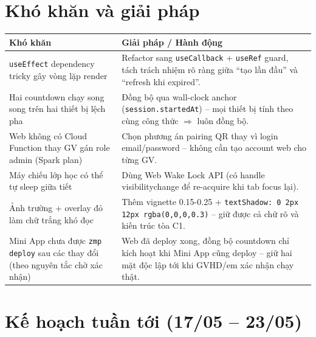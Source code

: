 \documentclass{article}
\begin{document}
\section{Khó khăn và giải pháp}

\begin{tabularx}{\textwidth}{@{}X X@{}}
\toprule
\textbf{Khó khăn} & \textbf{Giải pháp / Hành động} \\
\midrule
\texttt{useEffect} dependency tricky gây vòng lặp render & Refactor sang \texttt{useCallback} + \texttt{useRef} guard, tách trách nhiệm rõ ràng giữa ``tạo lần đầu'' và ``refresh khi expired''. \\
\addlinespace
Hai countdown chạy song song trên hai thiết bị lệch pha & Đồng bộ qua wall-clock anchor (\texttt{session.startedAt}) -- mọi thiết bị tính theo cùng công thức $\Rightarrow$ luôn đồng bộ. \\
\addlinespace
Web không có Cloud Function thay GV gán role admin (Spark plan) & Chọn phương án pairing QR thay vì login email/password -- không cần tạo account web cho từng GV. \\
\addlinespace
Máy chiếu lớp học có thể tự sleep giữa tiết & Dùng Web Wake Lock API (có handle visibilitychange để re-acquire khi tab focus lại). \\
\addlinespace
Ảnh trường + overlay đỏ làm chữ trắng khó đọc & Thêm vignette 0.15-0.25 + \texttt{textShadow: 0 2px 12px rgba(0,0,0,0.3)} -- giữ được cả chữ rõ và kiến trúc tòa C1. \\
\addlinespace
Mini App chưa được \texttt{zmp deploy} sau các thay đổi (theo nguyên tắc chờ xác nhận) & Web đã deploy xong, đồng bộ countdown chỉ kích hoạt khi Mini App cũng deploy -- giữ hai mặt độc lập tới khi GVHD/em xác nhận chạy thật. \\
\bottomrule
\end{tabularx}

\section{Kế hoạch tuần tới (17/05 -- 23/05)}
\end{document}
